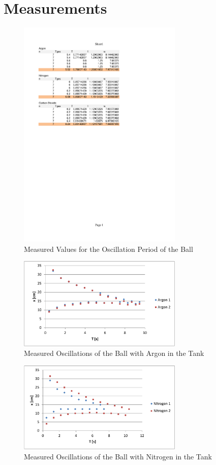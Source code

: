\documentclass{scrreprt}
\begin{document}
\section{Measurements}
\begin{figure}[H]
	\centering
  \includegraphics[width=0.7\textwidth]{diag/rawvals.pdf}
	\caption{Measured Values for the Oscillation Period of the Ball}
	\label{fig:measurement}
\end{figure}

\begin{figure}[H]
	\centering
  \includegraphics[width=0.7\textwidth]{diag/argon.pdf}
	\caption{Measured Oscillations of the Ball with Argon in the Tank}
	\label{fig:argon}
\end{figure}

\begin{figure}[H]
	\centering
  \includegraphics[width=0.7\textwidth]{diag/nitrogen.pdf}
	\caption{Measured Oscillations of the Ball with Nitrogen in the Tank}
	\label{fig:nitrogen}
\end{figure}
\end{document}
